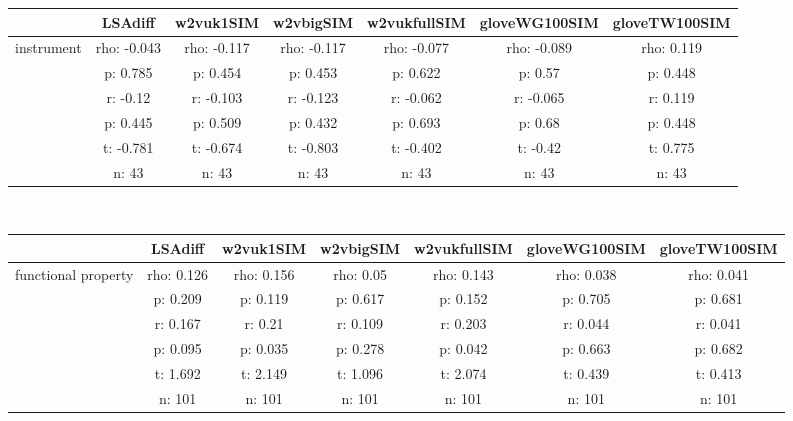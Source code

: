 \documentclass{article}
\begin{document}
\begin{tabular}{ccccccc|}\cline{2-7}
&\multicolumn{1}{|c}{LSAdiff} & w2vuk1SIM & w2vbigSIM & w2vukfullSIM & gloveWG100SIM & gloveTW100SIM \\\hline
\multicolumn{1}{|c|}{\multirow{6}{*}{instrument}} & rho: -0.043 & rho: -0.117 & rho: -0.117 & rho: -0.077 & rho: -0.089 & rho: 0.119 \\
\multicolumn{1}{|c|}{} & p: 0.785 & p: 0.454 & p: 0.453 & p: 0.622 & p: 0.57 & p: 0.448 \\
\multicolumn{1}{|c|}{} & r: -0.12 & r: -0.103 & r: -0.123 & r: -0.062 & r: -0.065 & r: 0.119 \\
\multicolumn{1}{|c|}{} & p: 0.445 & p: 0.509 & p: 0.432 & p: 0.693 & p: 0.68 & p: 0.448 \\
\multicolumn{1}{|c|}{} & t: -0.781 & t: -0.674 & t: -0.803 & t: -0.402 & t: -0.42 & t: 0.775 \\
\multicolumn{1}{|c|}{} & n: 43 & n: 43 & n: 43 & n: 43 & n: 43 & n: 43 \\
\hline
\end{tabular}\\
\begin{tabular}{ccccccc|}\cline{2-7}
&\multicolumn{1}{|c}{LSAdiff} & w2vuk1SIM & w2vbigSIM & w2vukfullSIM & gloveWG100SIM & gloveTW100SIM \\\hline
\multicolumn{1}{|c|}{\multirow{6}{*}{functional property}} & rho: 0.126 & rho: 0.156 & rho: 0.05 & rho: 0.143 & rho: 0.038 & rho: 0.041 \\
\multicolumn{1}{|c|}{} & p: 0.209 & p: 0.119 & p: 0.617 & p: 0.152 & p: 0.705 & p: 0.681 \\
\multicolumn{1}{|c|}{} & r: 0.167 & r: 0.21 & r: 0.109 & r: 0.203 & r: 0.044 & r: 0.041 \\
\multicolumn{1}{|c|}{} & p: 0.095 & p: 0.035 & p: 0.278 & p: 0.042 & p: 0.663 & p: 0.682 \\
\multicolumn{1}{|c|}{} & t: 1.692 & t: 2.149 & t: 1.096 & t: 2.074 & t: 0.439 & t: 0.413 \\
\multicolumn{1}{|c|}{} & n: 101 & n: 101 & n: 101 & n: 101 & n: 101 & n: 101 \\
\hline
\end{tabular}\\
\end{document}
